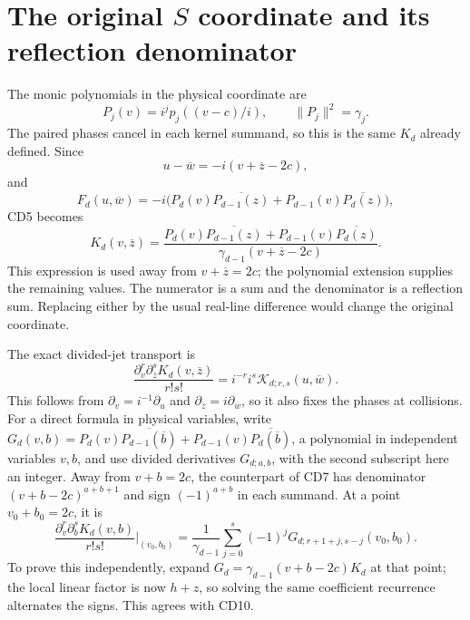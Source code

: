 \documentclass[11pt]{article}
\begin{document}
\section{The original \(S\) coordinate and its reflection denominator}

The monic polynomials in the physical coordinate are
\[
 P_j(v)=i^jp_j((v-c)/i),\qquad \|P_j\|^2=\gamma_j.
\]
The paired phases cancel in each kernel summand, so this is the same
\(K_d\) already defined. Since
\[
 u-\overline w=-i(v+\overline z-2c),
\]
and
\[
 F_d(u,\overline w)=-i\bigl(
 P_d(v)\overline{P_{d-1}(z)}+
 P_{d-1}(v)\overline{P_d(z)}\bigr),
\]
CD5 becomes
\begin{equation}\label{cdroot:eq:S-CD}
 \boxed{K_d(v,\overline z)=
 \frac{P_d(v)\overline{P_{d-1}(z)}+
       P_{d-1}(v)\overline{P_d(z)}}
      {\gamma_{d-1}(v+\overline z-2c)}.}
 \tag{CD9}
\end{equation}
This expression is used away from \(v+\overline z=2c\); the
polynomial extension supplies the remaining values. The numerator is a
sum and the denominator is a reflection sum. Replacing either by the
usual real-line difference would change the original coordinate.

The exact divided-jet transport is
\begin{equation}\label{cdroot:eq:S-jets}
 \frac{\partial_v^r\partial_{\overline z}^sK_d(v,\overline z)}{r!s!}
   =i^{-r}i^s\mathcal K_{d;r,s}(u,\overline w).
 \tag{CD10}
\end{equation}
This follows from \(\partial_v=i^{-1}\partial_u\) and
\(\partial_{\overline z}=i\partial_{\overline w}\), so it also
fixes the phases at collisions. For a direct formula in physical
variables, write \(G_d(v,b)=P_d(v)\overline{P_{d-1}(\overline b)}+
P_{d-1}(v)\overline{P_d(\overline b)}\), a polynomial in independent
variables \(v,b\), and use divided derivatives \(G_{d;a,b}\), with
the second subscript here an integer. Away from \(v+b=2c\), the
counterpart of CD7 has denominator \((v+b-2c)^{a+b+1}\) and sign
\((-1)^{a+b}\) in each summand. At a point \(v_0+b_0=2c\), it is
\begin{equation}\label{cdroot:eq:S-jets-collision}
 \frac{\partial_v^r\partial_b^sK_d(v,b)}{r!s!}
 \bigg|_{(v_0,b_0)}
  =\frac1{\gamma_{d-1}}
      \sum_{j=0}^s(-1)^jG_{d;r+1+j,s-j}(v_0,b_0).
 \tag{CD11}
\end{equation}
To prove this independently, expand
\(G_d=\gamma_{d-1}(v+b-2c)K_d\) at that point; the local linear
factor is now \(h+z\), so solving the same coefficient recurrence
alternates the signs. This agrees with CD10.
\end{document}
